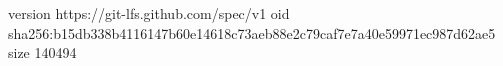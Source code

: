 version https://git-lfs.github.com/spec/v1
oid sha256:b15db338b4116147b60e14618c73aeb88e2c79caf7e7a40e59971ec987d62ae5
size 140494
